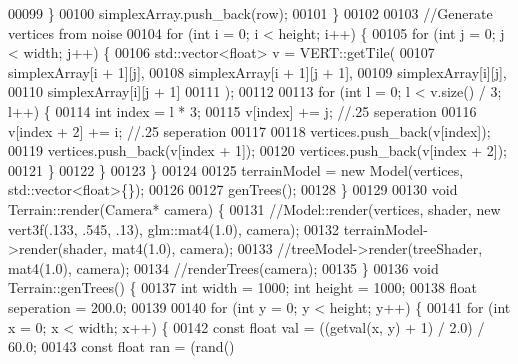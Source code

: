 \begin{DoxyCode}
00099 \textcolor{comment}{        \}}
00100 \textcolor{comment}{        simplexArray.push\_back(row);}
00101 \textcolor{comment}{    \}}
00102 \textcolor{comment}{}
00103 \textcolor{comment}{    //Generate vertices from noise}
00104 \textcolor{comment}{    for (int i = 0; i < height; i++) \{}
00105 \textcolor{comment}{        for (int j = 0; j < width; j++) \{}
00106 \textcolor{comment}{            std::vector<float> v = VERT::getTile(}
00107 \textcolor{comment}{                simplexArray[i + 1][j], }
00108 \textcolor{comment}{                simplexArray[i + 1][j + 1],}
00109 \textcolor{comment}{                simplexArray[i][j], }
00110 \textcolor{comment}{                simplexArray[i][j + 1]}
00111 \textcolor{comment}{            );}
00112 \textcolor{comment}{        }
00113 \textcolor{comment}{            for (int l = 0; l < v.size() / 3; l++) \{}
00114 \textcolor{comment}{                int index = l * 3;}
00115 \textcolor{comment}{                v[index] += j;    //.25 seperation}
00116 \textcolor{comment}{                v[index + 2] += i;    //.25 seperation}
00117 \textcolor{comment}{}
00118 \textcolor{comment}{                vertices.push\_back(v[index]);}
00119 \textcolor{comment}{                vertices.push\_back(v[index + 1]);}
00120 \textcolor{comment}{                vertices.push\_back(v[index + 2]);}
00121 \textcolor{comment}{            \}}
00122 \textcolor{comment}{        \}}
00123 \textcolor{comment}{    \}}
00124 \textcolor{comment}{}
00125 \textcolor{comment}{    terrainModel = new Model(vertices, std::vector<float>\{\});}
00126 \textcolor{comment}{}
00127 \textcolor{comment}{    genTrees();}
00128 \textcolor{comment}{\}}
00129 \textcolor{comment}{}
00130 \textcolor{comment}{void Terrain::render(Camera* camera) \{}
00131 \textcolor{comment}{    //Model::render(vertices, shader, new vert3f(.133, .545, .13), glm::mat4(1.0), camera);}
00132 \textcolor{comment}{    terrainModel->render(shader, mat4(1.0), camera);}
00133 \textcolor{comment}{    //treeModel->render(treeShader, mat4(1.0), camera);}
00134 \textcolor{comment}{    //renderTrees(camera);}
00135 \textcolor{comment}{\}}
00136 \textcolor{comment}{void Terrain::genTrees() \{}
00137 \textcolor{comment}{    int width = 1000; int height = 1000;}
00138 \textcolor{comment}{    float seperation = 200.0;}
00139 \textcolor{comment}{}
00140 \textcolor{comment}{    for (int y = 0; y < height; y++) \{}
00141 \textcolor{comment}{        for (int x = 0; x < width; x++) \{}
00142 \textcolor{comment}{            const float val = ((getval(x, y) + 1) / 2.0) / 60.0;}
00143 \textcolor{comment}{            const float ran = (rand() %
}
\end{DoxyCode}
